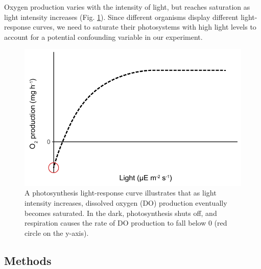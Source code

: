 \documentclass[]{book}
\theoremstyle{definition}
\theoremstyle{definition}
\theoremstyle{definition}
\theoremstyle{remark}
\begin{document}
Oxygen production varies with the intensity of light, but reaches
saturation as light intensity increases (Fig.
\ref{fig:light-response-fig}). Since different organisms display
different light-response curves, we need to saturate their photosystems
with high light levels to account for a potential confounding variable
in our experiment.

\begin{figure}
\centering
\includegraphics{chapter_materials/physiological_ecology/light_response_curve.pdf}
\caption{\label{fig:light-response-fig}A photosynthesis light-response curve
illustrates that as light intensity increases, dissolved oxygen (DO)
production eventually becomes saturated. In the dark, photosynthesis
shuts off, and respiration causes the rate of DO production to fall
below 0 (red circle on the y-axis).}
\end{figure}

\subsection{Methods}\label{methods}
\end{document}
